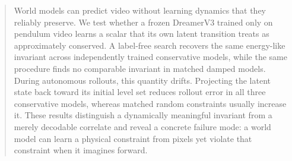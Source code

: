 \begin{abstract}
World models can predict video without learning dynamics that they reliably preserve. We test
whether a frozen DreamerV3 trained only on pendulum video learns a scalar that its own latent
transition treats as approximately conserved. A label-free search recovers the same energy-like
invariant across independently trained conservative models, while the same procedure finds no
comparable invariant in matched damped models. During autonomous rollouts, this quantity drifts.
Projecting the latent state back toward its initial level set reduces rollout error in all three
conservative models, whereas matched random constraints usually increase it. These results
distinguish a dynamically meaningful invariant from a merely decodable correlate and reveal a
concrete failure mode: a world model can learn a physical constraint from pixels yet violate that
constraint when it imagines forward.
\end{abstract}
